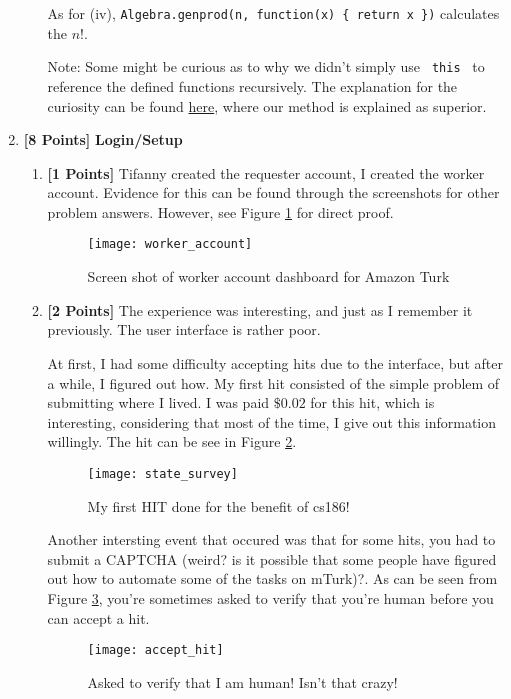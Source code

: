 \documentclass[11pt]{article}
\newcommand{\points}[1]{\textbf{[#1 Points]}}
\begin{document}
\begin{enumerate}
\begin{enumerate}
As for (iv), \texttt{Algebra.genprod(n, function(x) \{ return x \})} calculates the $n!$.

Note: Some might be curious as to why we didn't simply use \texttt{ this } to reference the defined functions recursively. The explanation for the curiosity can be found \href{http://stackoverflow.com/questions/9006587/javascript-object-literal-method-recursive-call}{here}, where our method is explained as superior.

\end{enumerate}
%
\item \points{8} {\bf Login/Setup}

\begin{enumerate}
\item \points{1} Tifanny created the requester account, I created the worker account. Evidence for this can be found through the screenshots for other problem answers. However, see Figure \ref{fig:worker_account} for direct proof.

\begin{figure}[!h]
\centering
\texttt{[image: worker\_account]}
\caption{Screen shot of worker account dashboard for Amazon Turk}
\label{fig:worker_account}
\end{figure}

\item \points{2} 
The experience was interesting, and just as I remember it previously. The user interface is rather poor.

At first, I had some difficulty accepting hits due to the interface, but after a while, I figured out how. My first hit consisted of the simple problem of submitting where I lived. I was paid $\$0.02$ for this hit, which is interesting, considering that most of the time, I give out this information willingly. The hit can be see in Figure \ref{fig:state_survey}.

\begin{figure}[!h]
\centering
\texttt{[image: state\_survey]}
\caption{My first HIT done for the benefit of cs186!}
\label{fig:state_survey}
\end{figure}

Another intersting event that occured was that for some hits, you had to submit a CAPTCHA (weird? is it possible that some people have figured out how to automate some of the tasks on mTurk)?. As can be seen from Figure \ref{fig:accept_hit}, you're sometimes asked to verify that you're human before you can accept a hit.

\begin{figure}[!h]
\centering
\texttt{[image: accept\_hit]}
\caption{Asked to verify that I am human! Isn't that crazy!}
\label{fig:accept_hit}
\end{figure}


\end{enumerate}
\end{enumerate}
\end{document}
